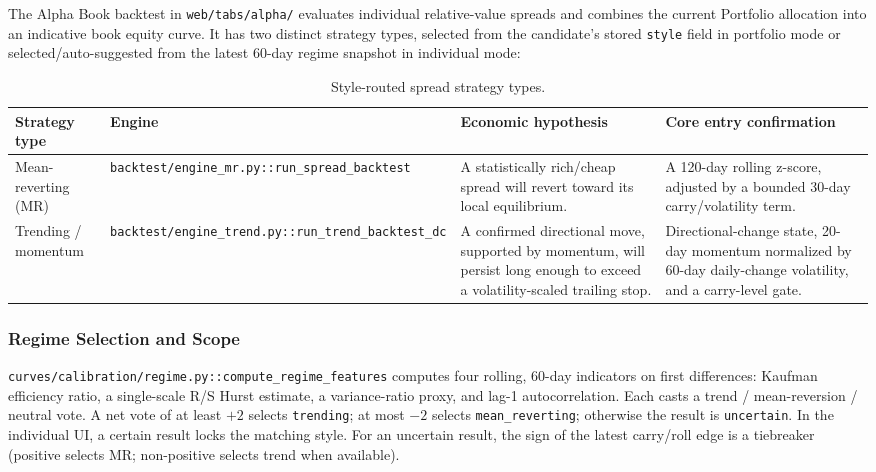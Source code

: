 The Alpha Book backtest in \texttt{web/tabs/alpha/} evaluates individual relative-value
spreads and combines the current Portfolio allocation into an indicative book
equity curve. It has two distinct strategy types, selected from the candidate's
stored \texttt{style} field in portfolio mode or selected/auto-suggested from the latest
60-day regime snapshot in individual mode:

\begin{table}[htbp]
\centering
\small
\setlength{\tabcolsep}{6pt}
\renewcommand{\arraystretch}{1.2}
\begin{tabular}{p{} p{} p{} p{}}
\hline
\textbf{Strategy type} & \textbf{Engine} & \textbf{Economic hypothesis} & \textbf{Core entry confirmation} \\
\hline
Mean-reverting (MR) & \texttt{backtest/engine\_mr.py::run\_spread\_backtest} & A statistically rich/cheap spread will revert toward its local equilibrium. & A 120-day rolling z-score, adjusted by a bounded 30-day carry/volatility term. \\
Trending / momentum & \texttt{backtest/engine\_trend.py::run\_trend\_backtest\_dc} & A confirmed directional move, supported by momentum, will persist long enough to exceed a volatility-scaled trailing stop. & Directional-change state, 20-day momentum normalized by 60-day daily-change volatility, and a carry-level gate. \\
\hline
\end{tabular}
\caption{Style-routed spread strategy types.}
\label{tab:pairs-strategy-types}
\end{table}

\subsubsection{Regime Selection and Scope}

\texttt{curves/calibration/regime.py::compute\_regime\_features} computes four rolling,
60-day indicators on first differences: Kaufman efficiency ratio, a single-scale
R/S Hurst estimate, a variance-ratio proxy, and lag-1 autocorrelation. Each casts a
trend / mean-reversion / neutral vote. A net vote of at least $+2$ selects
\texttt{trending}; at most $-2$ selects \texttt{mean\_reverting}; otherwise the result is
\texttt{uncertain}. In the individual UI, a certain result locks the matching style. For
an uncertain result, the sign of the latest carry/roll edge is a tiebreaker
(positive selects MR; non-positive selects trend when available).

